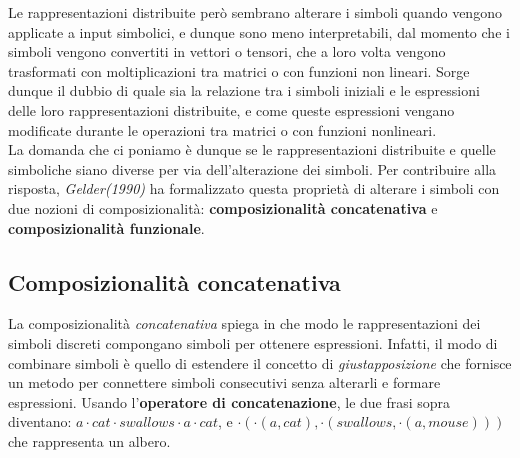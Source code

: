 Le rappresentazioni distribuite però sembrano alterare i simboli quando vengono applicate a input simbolici, e dunque sono meno interpretabili, dal momento che i simboli vengono convertiti in vettori o tensori, che a loro volta vengono trasformati con moltiplicazioni tra matrici o con funzioni non lineari. Sorge dunque il dubbio di quale sia la relazione tra i simboli iniziali e le espressioni delle loro rappresentazioni distribuite, e come queste espressioni vengano modificate durante le operazioni tra matrici o con funzioni nonlineari. \\
La domanda che ci poniamo è dunque se le rappresentazioni distribuite e quelle simboliche siano diverse per via dell'alterazione dei simboli. Per contribuire alla risposta, \textit{Gelder(1990)} ha formalizzato questa proprietà di alterare i simboli con due nozioni di composizionalità: \textbf{composizionalità concatenativa} e \textbf{composizionalità funzionale}.

\subsection{Composizionalità concatenativa}
La composizionalità \textit{concatenativa} spiega in che modo le rappresentazioni dei simboli discreti compongano simboli per ottenere espressioni. Infatti, il modo di combinare simboli è quello di estendere il concetto di \textit{giustapposizione} che fornisce un metodo per connettere simboli consecutivi senza alterarli e formare espressioni. Usando l'\textbf{operatore di concatenazione}, le due frasi sopra diventano: $a \cdot cat \cdot swallows \cdot a \cdot cat$, e $\cdot(\cdot(a,cat),\cdot(swallows,\cdot(a,mouse)))$ che rappresenta un albero. 

